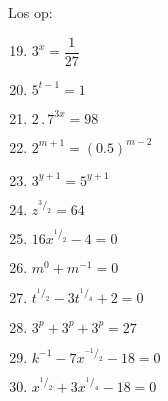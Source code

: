\begin{eocexercises}{}
Los op:
\begin{multicols}{2}
\begin{enumerate}[noitemsep, label=\textbf{\arabic*}., itemsep=5pt]
\setcounter{enumi}{18}
\item $ 3^x = \dfrac{1}{27} $
\item $ 5^{t-1} = 1 $
\item $ 2 \,.\, 7^{3x} = 98 $
\item $ 2^{m+1} = (0.5)^{m-2}$
\item $ 3^{y+1} = 5^{y+1} $
\item $ z^{^3/_2} = 64 $
\item $ 16x^{^1/_2} - 4 = 0 $
\item $ m^0 + m^{-1} = 0 $
\item $ t^{^1/_2} - 3t^{^1/_4} + 2 = 0 $
\item $ 3^p + 3^p + 3^p = 27 $
\item $ k^{-1} - 7x^{^{-1}/_2} -18 = 0 $
\item $ x^{^1/_2}+3x^{^1/_4}-18 = 0 $
\end{enumerate}
\end{multicols}


\end{eocexercises}

